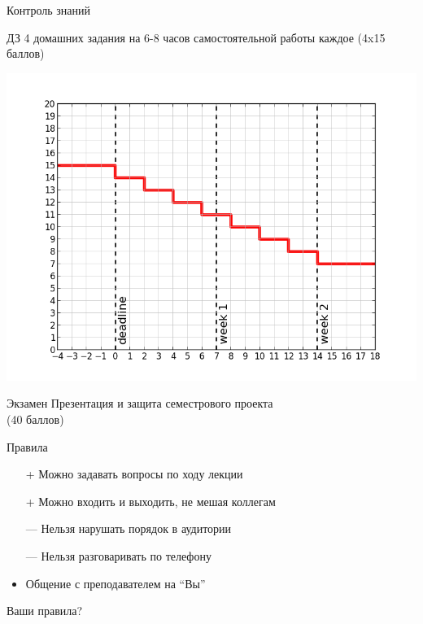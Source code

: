 \documentclass[10pt]{beamer}
\begin{document}
\begin{frame}{Контроль знаний}

\begin{block}{ДЗ}
4 домашних задания на 6-8 часов самостоятельной работы каждое (4x15 баллов)
\end{block}

\begin{center}
\includegraphics[scale=0.28]{images/hw.png}
\end{center}

\begin{alertblock}{Экзамен}
Презентация и защита семестрового проекта \\ (40 баллов)
\end{alertblock}

\end{frame}

\begin{frame}{Правила}

\begin{itemize}
\item[+] Можно задавать вопросы по ходу лекции
\item[+] Можно входить и выходить, не мешая коллегам
\item[---] Нельзя нарушать порядок в аудитории
\item[---] Нельзя разговаривать по телефону
\item Общение с преподавателем на ``Вы''
\end{itemize}

Ваши правила?

\end{frame}
\end{document}
